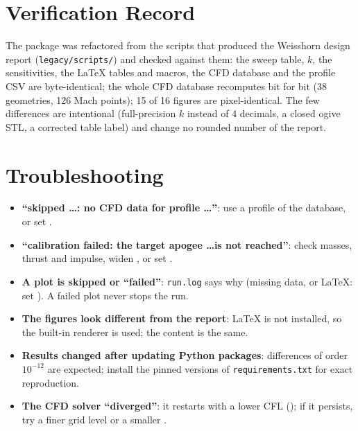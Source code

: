 \section{Verification Record}
\label{app:verification}

The package was refactored from the scripts that produced the Weisshorn design report (\texttt{legacy/scripts/})
and checked against them: the sweep table, $k$, the sensitivities, the LaTeX tables and macros, the CFD database
and the profile CSV are byte-identical; the whole CFD database recomputes bit for bit (38 geometries, 126 Mach
points); 15 of 16 figures are pixel-identical. The few differences are intentional (full-precision $k$ instead of 4
decimals, a closed ogive STL, a corrected table label) and change no rounded number of the report.

\section{Troubleshooting}

\begin{itemize}[leftmargin=*,itemsep=2pt]
\item \textbf{``skipped \dots: no CFD data for profile \dots''}: use a profile of the database, or set
.
\item \textbf{``calibration failed: the target apogee \dots is not reached''}: check masses, thrust and impulse, widen
, or set .
\item \textbf{A plot is skipped or ``failed''}: \texttt{run.log} says why (missing data, or LaTeX: set
). A failed plot never stops the run.
\item \textbf{The figures look different from the report}: LaTeX is not installed, so the built-in renderer is used;
the content is the same.
\item \textbf{Results changed after updating Python packages}: differences of order $10^{-12}$ are expected; install
the pinned versions of \texttt{requirements.txt} for exact reproduction.
\item \textbf{The CFD solver ``diverged''}: it restarts with a lower CFL (); if it persists,
try a finer grid level or a smaller .
\end{itemize}
